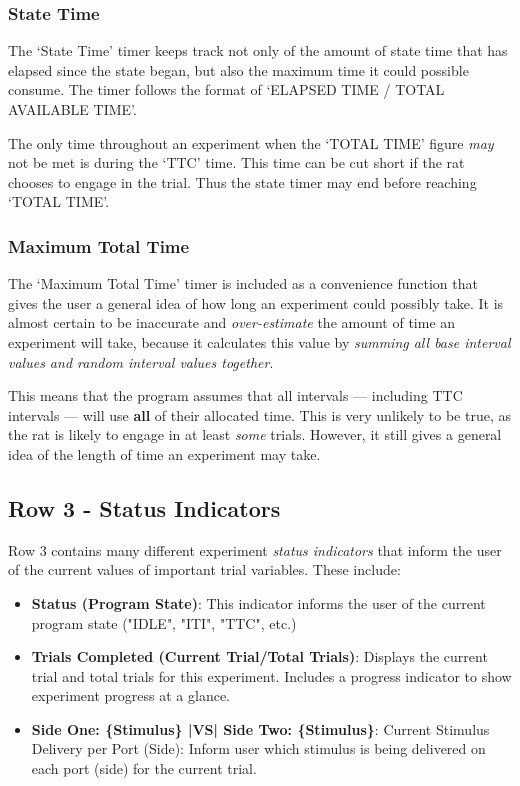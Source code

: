 \documentclass{article}
\begin{document}
\subsubsection{State Time}
The `State Time' timer keeps track not only of the amount of state time that has elapsed since the state began, but also the maximum time it could 
possible consume. The timer follows the format of `ELAPSED TIME / TOTAL AVAILABLE TIME'. 

The only time throughout an experiment when the `TOTAL TIME' figure \textit{may} not be met is during the `TTC' time. This time can be cut short if the rat chooses to engage
in the trial. Thus the state timer may end before reaching `TOTAL TIME'.

\subsubsection{Maximum Total Time}
The `Maximum Total Time' timer is included as a convenience function that gives the user a general idea of how long an experiment could possibly take. It is almost certain to 
be inaccurate and \textit{over-estimate} the amount of time an experiment will take, because it calculates this value by \textit{summing all base interval values and random 
interval values together}. 

This means that the program assumes that all intervals --- including TTC intervals --- will use \textbf{all} of their allocated time. This is
very unlikely to be true, as the rat is likely to engage in at least \textit{some} trials. However, it still gives a general idea of the length of time an experiment 
may take.

\newpage
\subsection{Row 3 - Status Indicators}
Row 3 contains many different experiment \textit{status indicators} that inform the user of the current values of important trial variables. 
These include:

\begin{itemize}
    \item \textbf{Status (Program State)}: This indicator informs the user of the current program state ("IDLE", "ITI", "TTC", etc.)
    \item \textbf{Trials Completed (Current Trial/Total Trials)}: Displays the current trial and total trials for this experiment. Includes 
        a progress indicator to show experiment progress at a glance.
    \item \textbf{Side One: \{Stimulus\} |VS| Side Two: \{Stimulus\}}: Current Stimulus Delivery per Port (Side): Inform user which stimulus 
        is being delivered on each port (side) for the current trial. 
\end{itemize}
\end{document}
